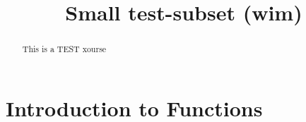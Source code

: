 \documentclass[12pt]{xourse}
\begin{document}
\title{Small test-subset (wim)}{}

\begin{abstract}
This is a TEST xourse
\end{abstract} 

\maketitle

\part{Introduction to Functions}


\end{document}
